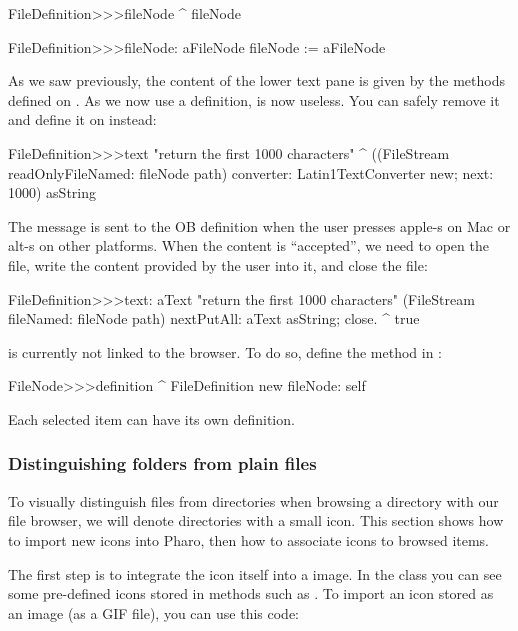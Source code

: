 \documentclass[a4paper,10pt,twoside]{book}
\begin{document}
\begin{code}{}    
FileDefinition>>>fileNode
	^ fileNode

FileDefinition>>>fileNode: aFileNode
	fileNode := aFileNode
\end{code}

As we saw previously, the content of the lower text pane is given by the  methods defined on . As we now use a definition,  is now useless. You can safely remove it and define it on  instead:

\begin{code}{}
FileDefinition>>>text
	"return the first 1000 characters"
     ^ ((FileStream readOnlyFileNamed: fileNode path) converter: Latin1TextConverter new; 
              next: 1000) asString
\end{code}

The message  is sent to the OB definition when the user presses apple-s  on Mac or alt-s on other platforms. When the content is ``accepted'', we need to open the file, write the content provided by the user into it, and close the file:

\begin{code}{}
FileDefinition>>>text: aText
	"return the first 1000 characters"
     (FileStream fileNamed: fileNode path) 
				nextPutAll: aText asString;
				close.
	^ true
\end{code}

 is currently not linked to the browser. To do so, define the method  in :

\begin{code}{}
FileNode>>>definition
	^ FileDefinition new fileNode: self
\end{code}

Each selected item can have its own definition. 

\subsubsection{Distinguishing folders from plain files}

To visually distinguish files from directories when browsing a directory with our file browser, we will denote directories with a small icon. This section shows how to import new icons into Pharo, then how to associate icons to browsed items.

The first step is to integrate the icon itself into a \pharo image. In the class  you can see some pre-defined icons stored in methods such as . To import an icon stored as an image (\eg as a GIF file), you can use this code:
\end{document}
